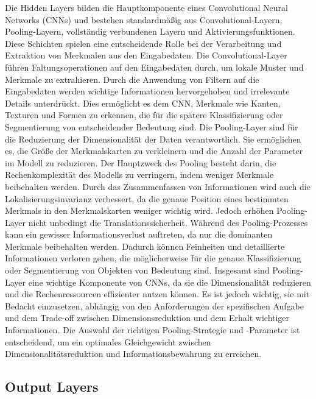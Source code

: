     Die Hidden Layers bilden die Hauptkomponente eines Convolutional Neural Networks (CNNs) und bestehen standardmäßig aus Convolutional-Layern, Pooling-Layern, vollständig verbundenen Layern und Aktivierungsfunktionen. 
    Diese Schichten spielen eine entscheidende Rolle bei der Verarbeitung und Extraktion von Merkmalen aus den Eingabedaten.
    Die Convolutional-Layer führen Faltungsoperationen auf den Eingabedaten durch, um lokale Muster und Merkmale zu extrahieren. Durch die Anwendung von Filtern auf die Eingabedaten werden wichtige Informationen hervorgehoben und irrelevante Details unterdrückt. 
    Dies ermöglicht es dem CNN, Merkmale wie Kanten, Texturen und Formen zu erkennen, die für die spätere Klassifizierung oder Segmentierung von entscheidender Bedeutung sind.
    Die Pooling-Layer sind für die Reduzierung der Dimensionalität der Daten verantwortlich. 
    Sie ermöglichen es, die Größe der Merkmalskarten zu verkleinern und die Anzahl der Parameter im Modell zu reduzieren. 
    Der Hauptzweck des Pooling besteht darin, die Rechenkomplexität des Modells zu verringern, indem weniger Merkmale beibehalten werden. 
    Durch das Zusammenfassen von Informationen wird auch die Lokalisierungsinvarianz verbessert, da die genaue Position eines bestimmten Merkmals in den Merkmalskarten weniger wichtig wird.
    Jedoch erhöhen Pooling-Layer nicht unbedingt die Translationssicherheit. Während des Pooling-Prozesses kann ein gewisser Informationsverlust auftreten, da nur die dominanten Merkmale beibehalten werden. 
    Dadurch können Feinheiten und detaillierte Informationen verloren gehen, die möglicherweise für die genaue Klassifizierung oder Segmentierung von Objekten von Bedeutung sind.
    Insgesamt sind Pooling-Layer eine wichtige Komponente von CNNs, da sie die Dimensionalität reduzieren und die Rechenressourcen effizienter nutzen können. 
    Es ist jedoch wichtig, sie mit Bedacht einzusetzen, abhängig von den Anforderungen der spezifischen Aufgabe und dem Trade-off zwischen Dimensionsreduktion und dem Erhalt wichtiger Informationen. 
    Die Auswahl der richtigen Pooling-Strategie und -Parameter ist entscheidend, um ein optimales Gleichgewicht zwischen Dimensionalitätsreduktion und Informationsbewahrung zu erreichen.

\subsection{Output Layers}

